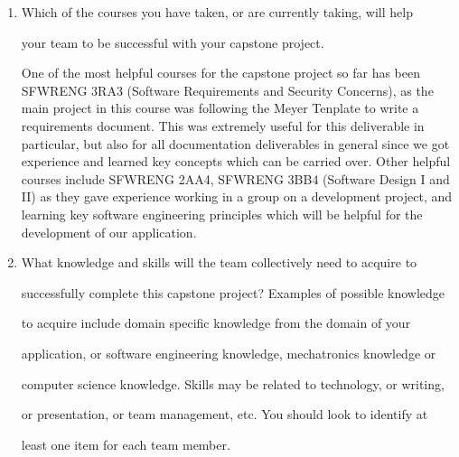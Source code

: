 \documentclass[12pt,letterpaper]{article}
\begin{document}
\begin{enumerate}
  The stakeholders for our project are McMaster students and faculty that commute to campus, so this would include our team members and many of our peers. By discussing our pain points and desires for this application
  with other students who are commuters, we were able to get a better understanding of what our application needs to include to meet their standards and expectations. This includes many of the features mentioned in section S.2,
  since this covers what is expected for each major component in the system. 
 
  \vspace{1em}
  \item Which of the courses you have taken, or are currently taking, will help 

  your team to be successful with your capstone project. \\
  \vspace{1em}

One of the most helpful courses for the capstone project so far has been SFWRENG 3RA3 (Software Requirements and Security Concerns), as the main project in this course was following the Meyer Tenplate to write a requirements document. 
This was extremely useful for this deliverable in particular, but also for all documentation deliverables in general since we got experience and learned key concepts which can be carried over. 
Other helpful courses include SFWRENG 2AA4, SFWRENG 3BB4 (Software Design I and II) as they gave experience working in a group on a development project, and learning key software engineering principles which will be helpful
for the development of our application. 
 
\vspace{1em}
  \item What knowledge and skills will the team collectively need to acquire to 

  successfully complete this capstone project?  Examples of possible knowledge 

  to acquire include domain specific knowledge from the domain of your 

  application, or software engineering knowledge, mechatronics knowledge or 

  computer science knowledge.  Skills may be related to technology, or writing, 

  or presentation, or team management, etc.  You should look to identify at 

  least one item for each team member. \\
  \vspace{1em}


\end{enumerate}
\end{document}
